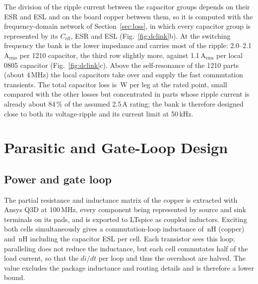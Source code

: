 \documentclass[conference]{IEEEtran}
\begin{document}
The division of the ripple current between the capacitor groups depends on their ESR and ESL and on the board copper between them, so it is computed with the frequency-domain network of Section~\ref{sec:loss}, in which every capacitor group is represented by its $C_\mathrm{eff}$, ESR and ESL (Fig.~\ref{fig:dclink}b). At the switching frequency the bank is the lower impedance and carries most of the ripple: 2.0--2.1\,A$_\mathrm{rms}$ per 1210 capacitor, the third row slightly more, against 1.1\,A$_\mathrm{rms}$ per local 0805 capacitor (Fig.~\ref{fig:dclink}c). Above the self-resonance of the 1210 parts (about 4\,MHz) the local capacitors take over and supply the fast commutation transients. The total capacitor loss is \Pcap\,W per leg at the rated point, small compared with the other losses but concentrated in parts whose ripple current is already about 84\,\% of the assumed 2.5\,A rating; the bank is therefore designed close to both its voltage-ripple and its current limit at 50\,kHz.

\section{Parasitic and Gate-Loop Design}\label{sec:para}
\subsection{Power and gate loop}
The partial resistance and inductance matrix of the copper is extracted with Ansys Q3D at 100\,MHz, every component being represented by source and sink terminals on its pads, and is exported to LTspice as coupled inductors. Exciting both cells simultaneously gives a commutation-loop inductance of \LloopCu\,nH (copper) and \LloopEsl\,nH including the capacitor ESL per cell. Each transistor sees this loop; paralleling does not reduce the inductance, but each cell commutates half of the load current, so that the $di/dt$ per loop and thus the overshoot are halved. The value excludes the package inductance and routing details and is therefore a lower bound.
\end{document}
